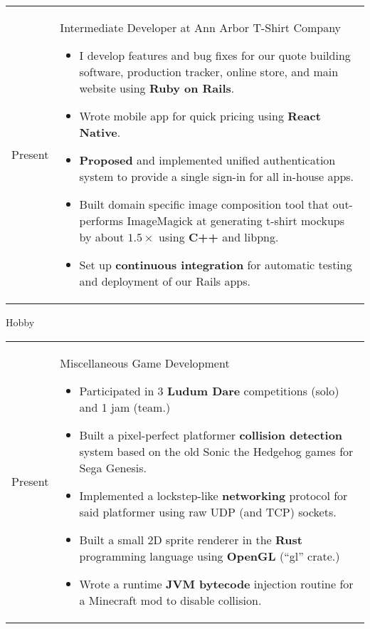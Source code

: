 \documentclass[12pt]{article}
\renewcommand{\section}[1]{{\Huge{#1}}\vspace{2 mm}}
\newenvironment{timeline}
        {\begin{tabular}{p{21 mm}|p{150 mm}}}
        {\end{tabular}}
\newenvironment{timelinetitle}
        {\vspace{-2 mm}\begin{large}}
        {\end{large}\vspace{-1.5 mm}}
\newcommand{\timespan}[2]{{#2}\newline{#1}}
\begin{document}
\begin{timeline}
\timespan{Winter 2014}{Present}
&
\begin{timelinetitle}
    Intermediate Developer at Ann Arbor T-Shirt Company
\end{timelinetitle}
\begin{itemize}
  \item I develop features and bug fixes for our quote building software,
        production tracker, online store, and main website using \textbf{Ruby on Rails}.

  \item Wrote mobile app for quick pricing using \textbf{React Native}.

  \item \textbf{Proposed} and implemented unified authentication system to provide a single
        sign-in for all in-house apps.

  \item Built domain specific image composition tool that out-performs ImageMagick
        at generating t-shirt mockups by about $1.5\times$ using \textbf{C++} and libpng.

  \item Set up \textbf{continuous integration} for automatic testing and deployment of
        our Rails apps.
\end{itemize}

\end{timeline}

\vspace{3.0 mm}
\section{Hobby}
\hline

\begin{timeline}
\timespan{2011}{Present}
&
\begin{timelinetitle}
    Miscellaneous Game Development
\end{timelinetitle}
\begin{itemize}
  \item Participated in 3 \textbf{Ludum Dare} competitions (solo) and 1 jam (team.)

  \item Built a pixel-perfect platformer \textbf{collision detection} system based on
        the old Sonic the Hedgehog games for Sega Genesis.

  \item Implemented a lockstep-like \textbf{networking} protocol for said platformer
        using raw UDP (and TCP) sockets.

  \item Built a small 2D sprite renderer in the \textbf{Rust} programming language using
        \textbf{OpenGL} (``gl'' crate.)

  \item Wrote a runtime \textbf{JVM bytecode} injection routine for a Minecraft mod to disable
        collision.
\end{itemize}

\end{timeline}
\end{document}
